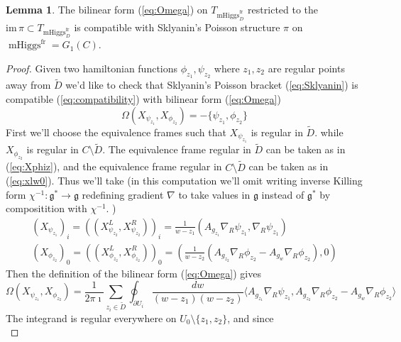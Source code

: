 \documentclass[11pt, oneside, reqno]{amsart}
\theoremstyle{definition} \newtheorem{definition}{Definition}[section]
\newtheorem{lemma}[definition]{Lemma}
\theoremstyle{definition} \newtheorem{remark}[definition]{Remark}
\theoremstyle{definition} \newtheorem{remarks}[definition]{Remarks}
\theoremstyle{definition} \newtheorem{question}[definition]{Question}
\theoremstyle{definition} \newtheorem*{note}{Note}
\theoremstyle{definition} \newtheorem{example}[definition]{Example}
\theoremstyle{definition} \newtheorem{examples}[definition]{Examples}
\renewcommand{\gg}{\mathfrak{g}}
\DeclareMathOperator{\mhiggs}{mHiggs}
\newcommand{\fr}{\mathrm{fr}}
\begin{document}
\begin{lemma}\label{lemma:OmegaPi}
  The bilinear form (\ref{eq:Omega}) on $T_{\mhiggs^{\fr}_{D}}$ 
restricted to the $\mathrm{im} \, \pi \subset T_{\mhiggs^{\fr}_{D}}$  is compatible
  with Sklyanin's Poisson structure $\pi$ on $\mhiggs^{\fr} = G_1(C)$.
\end{lemma}
\begin{proof}
  Given two hamiltonian functions $\phi_{z_1}, \psi_{z_2}$ where $z_1, z_2$ are regular
  points away from $\tilde D$ we'd like to check
  that Sklyanin's Poisson bracket (\ref{eq:Sklyanin})  
is compatible (\ref{eq:compatibility}) with bilinear form  (\ref{eq:Omega})
\begin{equation}
  \Omega(X_{\psi_{z_1}}, X_{\phi_{z_2}})  = - \{\psi_{z_1}, \phi_{z_2}\}
\end{equation}
First we'll choose the equivalence frames such that $X_{\psi_{z_1}}$ is regular in $\tilde D$. 
while $X_{\phi_{z_2}}$ is regular in $C \setminus \tilde D$.
The equivalence frame regular in $\tilde D$ can be taken as in  (\ref{eq:Xphiz}),
and the equivalence frame regular in $C \setminus \tilde D$ can be taken
as in (\ref{eq:xlw0}). Thus we'll take (in this computation we'll omit writing inverse
Killing form $\chi^{-1}: \gg^{*} \to \gg $ redefining gradient $\nabla$ to take values in $\gg$ instead of $\gg^{*}$
by compositition with $\chi^{-1}$. )
\begin{equation}
  \begin{aligned}
    (X_{\psi_{z_1}})_{i} = ((X_{\psi_{z_2}}^{L}, X_{\psi_{z_2}}^{R}))_{i} =  \frac{1}{w - z_1} (A_{g_{z_1}} \nabla_R \psi_{z_1},   \nabla_{R} \psi_{z_1}) \\
    (X_{\phi_{z_2}})_{0} = ((X_{\phi_{z_2}}^{L}, X_{\phi_{z_2}}^{R}))_{0} = ( \frac{1}{w - z_2} ( A_{g_{z_2}} \nabla_R \phi_{z_2} - A_{g_{w}} \nabla_{R} \phi_{z_2}), 0) 
  \end{aligned}
\end{equation}
Then the definition of the bilinear form (\ref{eq:Omega}) gives
\begin{equation}
  \label{eq:pairing}
  \Omega(X_{\psi_{z_1}}, X_{\phi_{z_2}}) = \frac{1}{2 \pi \imath }
  \sum_{z_i \in \tilde D} \oint_{\partial U_i} \frac{dw }{(w - z_1)(w - z_2)} \langle A_{g_{z_1}} \nabla_{R} \psi_{z_1},
  A_{g_{z_2}} \nabla_{R} \phi_{z_2}  - A_{g_w} \nabla_{R} \phi_{z_2} \rangle
\end{equation}
The integrand is regular everywhere on $U_0 \setminus \{z_1, z_2\}$, and since
\begin{equation}
\label{eq:residue}

\end{equation}
\end{proof}
\end{document}
